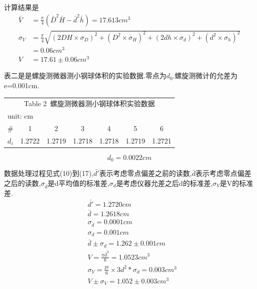 \documentclass[a4paper,10pt,notitlepage]{report}
\begin{document}
	计算结果是 \\
	
\begin{align}
	\bar{V} &= \frac{\pi}{4}(\bar{D}^2 \bar{H} - \bar{d}^2 \bar{h}) = 17.613 cm^3 \\
	\sigma_V &= \frac{\pi}{4}\sqrt{(2DH \times \sigma_D)^2 + (D^2 \times \sigma_H)^2 + (2dh \times \sigma_d)^2 + (d^2 \times \sigma_h)^2} \\
	& = 0.06 cm^3 \\
	V &= 17.61 \pm 0.06 cm^3
\end{align}

	表二是是螺旋测微器测小钢球体积的实验数据.零点为$d_0$.螺旋测微计的允差为e=0.001cm. \\
	
\begin{table}[htbp]
\centering
	\begin{tabular}{|c|c|c|c|c|c|c|}
	
		\multicolumn{7}{c}{Table 2\ 螺旋测微器测小钢球体积实验数据} \\
		\multicolumn{7}{l}{\scriptsize{unit: cm}} \\
		\hline
		\# & 1 & 2 & 3 & 4 & 5 & 6 \\
		\hline
		$d_i$ & 1.2722 & 1.2719 & 1.2718 & 1.2718 & 1.2719 & 1.2721 \\
		\hline

	\end{tabular}
\end{table}
	
\begin{equation}
	d_0 = 0.0022cm
\end{equation}
	
	数据处理过程见式(10)到(17),$\bar{d'}$表示考虑零点偏差之前的读数,$\bar{d}$表示考虑零点偏差之后的读数,$\sigma_{\bar{d}}$是d平均值的标准差,$\sigma_d$是考虑仪器允差之后d的标准差,$\sigma_V$是V的标准差. \\
		
\begin{align}
	&\bar{d'} = 1.2720cm \\
	&\bar{d} = 1.2618cm \\
	&\sigma_{\bar{d}} = 0.0001cm \\
	&\sigma_d = 0.001cm \\
	&\bar{d} \pm \sigma_d = 1.262 \pm 0.001 cm \\
	&V = \frac{\pi \bar{d}^3}{6} = 1.0523 cm^3 \\
	&\sigma_V = \frac{pi}{6} \times 3d^2 * \sigma_d = 0.003cm^3 \\
	&V \pm \sigma_V = 1.052 \pm 0.003 cm^3
\end{align}
	
\end{document}
